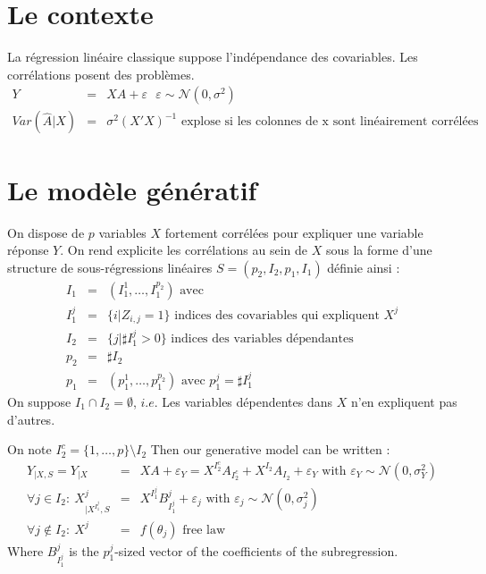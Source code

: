 \documentclass[12pt]{article}
\begin{document}

\section{Le contexte}
	La r\'egression lin\'eaire classique suppose l'ind\'ependance des covariables. Les corr\'elations posent des probl\`emes.
	\begin{eqnarray}
		Y&=&XA+\varepsilon \ \ \ \varepsilon\sim \mathcal{N}(0,\sigma^2) \\
		Var(\hat{A}|X)&=& \sigma^2(X'X)^{-1} \textrm{ explose si les colonnes de x sont lin\'eairement corr\'el\'ees}
	\end{eqnarray}
			
	
	
\section{Le mod\`ele g\'en\'eratif}
On dispose de $p$ variables $X$ fortement corr\'el\'ees pour expliquer une variable r\'eponse $Y$.
On rend explicite les corr\'elations au sein de $X$ sous la forme d'une structure de sous-r\'egressions lin\'eaires $S=(p_2,I_2,p_1,I_1)$ d\'efinie ainsi :
	\begin{eqnarray}
		I_1&=&(I_1^1,\dots,I_1^{p_2}) \textrm{ avec}		\\
		I_1^j &=& \{i |Z_{i,j}=1 \} \textrm{ indices des covariables qui expliquent $X^j$} \\
		I_2&=&\{j |\sharp I_1^j>0 \}  \textrm{ indices des variables d\'ependantes} \\
		p_2&=& \sharp I_2 \\
		p_1&=&(p_1^1,\dots,p_1^{p_2}) \textrm{ avec }p_1^j=\sharp I_1^j 
	\end{eqnarray}
	On suppose $I_1\cap I_2=\emptyset$, $i.e.$ Les variables d\'ependentes dans $X$ n'en expliquent pas d'autres. 
	
	On note $I_2^c=\{1,\dots,p\}\setminus I_2$
Then our generative model can be written :
\begin{eqnarray}
	Y_{|X,S}=Y_{|X}&=&XA+\varepsilon_Y= X^{I_2^c}A_{I_2^c}+X^{I_2}A_{I_2}+\varepsilon_Y \textrm{ with } \varepsilon_Y \sim \mathcal{N}(0,\sigma_Y^2) \label{MainR}\\
	\forall j \in I_2 : \  X^j_{|X^{I_1^j},S}&=&X^{I_1^j}B_{I_1^j}^j + \varepsilon_{j} \textrm{ with } \varepsilon_j \sim \mathcal{N}(0,\sigma_j^2) \label{SR}\\
    \forall j \notin I_2 : \ X^j &=& f(\theta_j) \textrm{ free law}	
\end{eqnarray}
Where $B_{I_1^j}^j$ is the $p_1^j$-sized vector of the coefficients of the subregression.
\end{document}
